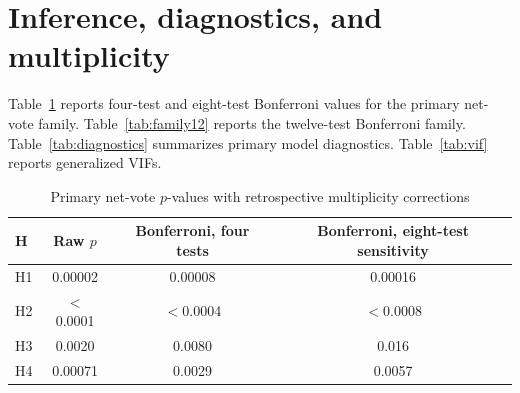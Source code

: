 \section{Inference, diagnostics, and multiplicity}
\label{app:inference}

Table~\ref{tab:pvalues} reports four-test and eight-test Bonferroni values for the primary net-vote family. Table~\ref{tab:family12} reports the twelve-test Bonferroni family. Table~\ref{tab:diagnostics} summarizes primary model diagnostics. Table~\ref{tab:vif} reports generalized VIFs.

\begin{table}[t]
\centering
\caption{Primary net-vote $p$-values with retrospective multiplicity corrections}
\label{tab:pvalues}
\scriptsize
\begin{tabular}{lccc}
\toprule
H & Raw $p$ & Bonferroni, four tests & Bonferroni, eight-test sensitivity \\
\midrule
H1 & 0.00002 & 0.00008 & 0.00016 \\
H2 & $<$0.0001 & $<$0.0004 & $<$0.0008 \\
H3 & 0.0020 & 0.0080 & 0.016 \\
H4 & 0.00071 & 0.0029 & 0.0057 \\
\bottomrule
\end{tabular}
\end{table}

